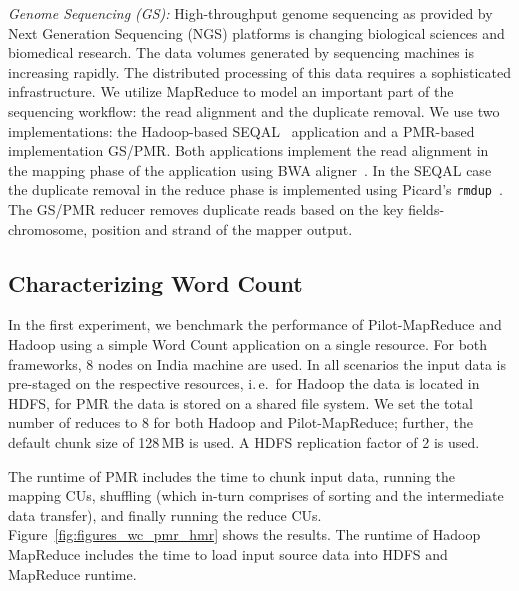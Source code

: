\documentclass{acm_proc_article-sp}
\newcommand{\pilotmapreduce}{Pilot-MapReduce\xspace}
\begin{document}
{\it Genome Sequencing (GS):} High-throughput genome sequencing as
provided by Next Generation Sequencing (NGS) platforms is changing biological
sciences and biomedical research. The data volumes generated by sequencing
machines is increasing rapidly. The distributed processing of this data requires
a sophisticated infrastructure. We utilize MapReduce to model
an important part of the sequencing workflow: the read alignment and the
duplicate removal. We use two implementations: the Hadoop-based
SEQAL~\cite{seal-2011} application and a PMR-based implementation 
GS/PMR. Both applications implement the read alignment in the mapping phase of
the application using BWA aligner~\cite{Li:2010:FAL:1741823.1741825}. In the
SEQAL case the duplicate removal in the reduce phase is implemented using
Picard's \texttt{rmdup}~\cite{picard}. 
The GS/PMR reducer removes duplicate reads based on the key
fields-chromosome, position and strand of the mapper output.


\subsection{Characterizing Word Count}


In the first experiment, we benchmark the performance of
\pilotmapreduce and Hadoop using a simple Word Count application on a
single resource. For both frameworks, 8 nodes on India machine are
used. In all scenarios the input data is pre-staged on the respective
resources, i.\,e.\ for Hadoop the data is located in HDFS, for PMR the
data is stored on a shared file system. We set the total number of
reduces to 8 for both Hadoop and \pilotmapreduce; further, the default
chunk size of 128\,MB is used. A HDFS replication factor of 2 is used.

The runtime of PMR includes the time to chunk input data, running the
mapping CUs, shuffling (which in-turn comprises of sorting and the
intermediate data transfer), and finally running the reduce CUs.
Figure~\ref{fig:figures_wc_pmr_hmr} shows the results. The runtime of
Hadoop MapReduce includes the time to load input source data into HDFS and
MapReduce runtime.
\end{document}
